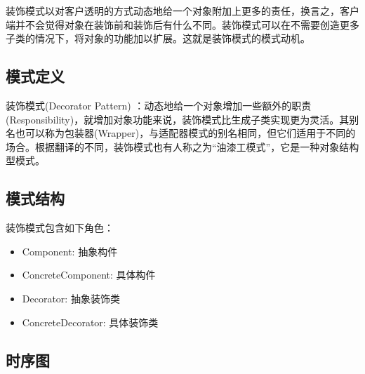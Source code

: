 \documentclass[letterpaper,10pt,english]{sphinxmanual}
\begin{document}
\sphinxAtStartPar
装饰模式以对客户透明的方式动态地给一个对象附加上更多的责任，换言之，客户端并不会觉得对象在装饰前和装饰后有什么不同。装饰模式可以在不需要创造更多子类的情况下，将对象的功能加以扩展。这就是装饰模式的模式动机。


\subsection{模式定义}
\label{\detokenize{structural_patterns/decorator:id4}}
\sphinxAtStartPar
装饰模式(Decorator Pattern) ：动态地给一个对象增加一些额外的职责(Responsibility)，就增加对象功能来说，装饰模式比生成子类实现更为灵活。其别名也可以称为包装器(Wrapper)，与适配器模式的别名相同，但它们适用于不同的场合。根据翻译的不同，装饰模式也有人称之为“油漆工模式”，它是一种对象结构型模式。


\subsection{模式结构}
\label{\detokenize{structural_patterns/decorator:id5}}
\sphinxAtStartPar
装饰模式包含如下角色：
\begin{itemize}
\item {} 
\sphinxAtStartPar
Component: 抽象构件

\item {} 
\sphinxAtStartPar
ConcreteComponent: 具体构件

\item {} 
\sphinxAtStartPar
Decorator: 抽象装饰类

\item {} 
\sphinxAtStartPar
ConcreteDecorator: 具体装饰类

\end{itemize}

\noindent{}


\subsection{时序图}
\label{\detokenize{structural_patterns/decorator:id6}}
\noindent{}
\end{document}
